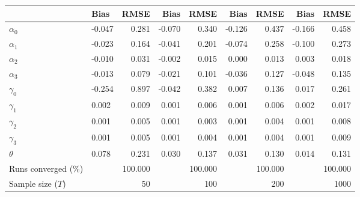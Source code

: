 
\begin{tabular}[t]{llrrrrrrr}
\toprule
  & Bias & RMSE & Bias & RMSE & Bias & RMSE & Bias & RMSE\\
\midrule
$\alpha_{0}$ & -0.047 & 0.281 & -0.070 & 0.340 & -0.126 & 0.437 & -0.166 & 0.458\\
$\alpha_{1}$ & -0.023 & 0.164 & -0.041 & 0.201 & -0.074 & 0.258 & -0.100 & 0.273\\
$\alpha_{2}$ & -0.010 & 0.031 & -0.002 & 0.015 & 0.000 & 0.013 & 0.003 & 0.018\\
$\alpha_{3}$ & -0.013 & 0.079 & -0.021 & 0.101 & -0.036 & 0.127 & -0.048 & 0.135\\
$\gamma_{0}$ & -0.254 & 0.897 & -0.042 & 0.382 & 0.007 & 0.136 & 0.017 & 0.261\\
$\gamma_{1}$ & 0.002 & 0.009 & 0.001 & 0.006 & 0.001 & 0.006 & 0.002 & 0.017\\
$\gamma_{2}$ & 0.001 & 0.005 & 0.001 & 0.003 & 0.001 & 0.004 & 0.001 & 0.008\\
$\gamma_{3}$ & 0.001 & 0.005 & 0.001 & 0.004 & 0.001 & 0.004 & 0.001 & 0.009\\
$\theta$ & 0.078 & 0.231 & 0.030 & 0.137 & 0.031 & 0.130 & 0.014 & 0.131\\
Runs converged (\%) &  & 100.000 &  & 100.000 &  & 100.000 &  & 100.000\\
Sample size ($T$) &  & 50 &  & 100 &  & 200 &  & 1000\\
\bottomrule
\end{tabular}
